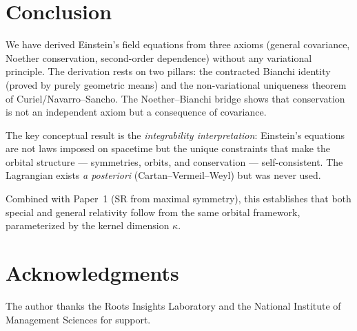 \documentclass[12pt]{article}
\theoremstyle{plain}
\theoremstyle{definition}
\theoremstyle{remark}
\begin{document}
\section{Conclusion}
\label{sec:conclusion}

We have derived Einstein's field equations from three axioms (general covariance, Noether conservation, second-order dependence) without any variational principle. The derivation rests on two pillars: the contracted Bianchi identity (proved by purely geometric means) and the non-variational uniqueness theorem of Curiel/Navarro--Sancho. The Noether--Bianchi bridge shows that conservation is not an independent axiom but a consequence of covariance.

The key conceptual result is the \emph{integrability interpretation}: Einstein's equations are not laws imposed on spacetime but the unique constraints that make the orbital structure --- symmetries, orbits, and conservation --- self-consistent. The Lagrangian exists \emph{a posteriori} (Cartan--Vermeil--Weyl) but was never used.

Combined with Paper~1 (SR from maximal symmetry), this establishes that both special and general relativity follow from the same orbital framework, parameterized by the kernel dimension $\kappa$.


\section*{Acknowledgments}

The author thanks the Roots Insights Laboratory and the National Institute of Management Sciences for support.
\end{document}
